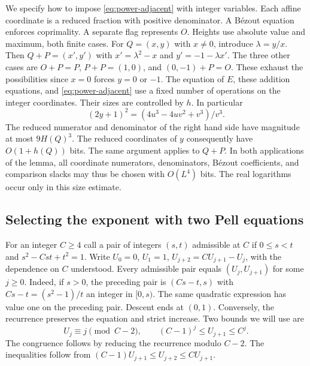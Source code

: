 \documentclass[11pt,letterpaper]{article}
\numberwithin{equation}{section}
\begin{document}
We specify how to impose \eqref{eq:power-adjacent} with integer
variables. Each affine coordinate is a reduced fraction with positive
denominator. A B\'ezout equation enforces coprimality. A separate flag
represents $O$. Heights use absolute value and maximum, both finite
cases. For $Q=(x,y)$ with $x\ne0$, introduce $\lambda=y/x$. Then
$Q+P=(x',y')$ with $x'=\lambda^2-x$ and $y'=-1-\lambda x'$.
The three other cases are $O+P=P$, $P+P=(1,0)$, and $(0,-1)+P=O$.
These exhaust the possibilities since $x=0$ forces $y=0$ or $-1$.
The equation of $E$, these addition equations, and
\eqref{eq:power-adjacent} use a fixed number of operations on the
integer coordinates. Their sizes are controlled by $h$. In particular
\[
      (2y+1)^2=(4u^3-4uv^2+v^3)/v^3 .
\]
The reduced numerator and denominator of the right hand side have
magnitude at most $9H(Q)^3$. The reduced coordinates of $y$ consequently
have $O(1+h(Q))$ bits. The same argument applies to $Q+P$. In both
applications of the lemma, all coordinate numerators, denominators,
B\'ezout coefficients, and comparison slacks may thus be chosen with
$O(L^4)$ bits. The real logarithms occur only in this size estimate.

\subsection{Selecting the exponent with two Pell equations}

For an integer $C\ge4$ call a pair of integers $(s,t)$ admissible at
$C$ if $0\le s<t$ and $s^2-Cst+t^2=1$. Write
$U_0=0$, $U_1=1$, $U_{j+2}=CU_{j+1}-U_j$, with the dependence
on $C$ understood. Every admissible pair equals $(U_j,U_{j+1})$
for some $j\ge0$. Indeed, if $s>0$, the preceding pair is
$(Cs-t,s)$ with $Cs-t=(s^2-1)/t$ an integer in $[0,s)$.
The same quadratic expression has value one on the preceding pair.
Descent ends at $(0,1)$. Conversely, the recurrence preserves the
equation and strict increase. Two bounds we will use are
\begin{equation}\label{eq:power-recurrence}
 U_j\equiv j\pmod{C-2},\qquad
 (C-1)^j\le U_{j+1}\le C^j .
\end{equation}
The congruence follows by reducing the recurrence modulo $C-2$. The
inequalities follow from
$(C-1)U_{j+1}\le U_{j+2}\le C U_{j+1}$.
\end{document}
